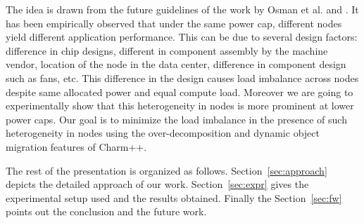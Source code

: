The idea  is drawn from the future guidelines of the work by Osman et
al.\cite{powerCluster2013} and \cite{osmanthesis}.  It has been empirically
observed that under the same power cap, different nodes yield different
application performance. This can be due to several design factors: difference
in chip designs, different in component assembly by the machine vendor,
   location of the node in the data center, difference in component design such
   as fans, etc. This difference in the design causes load imbalance across
   nodes despite same allocated power and equal compute load. Moreover we are
   going to experimentally show that this heterogeneity in nodes is more
   prominent at lower power caps.  Our goal is to minimize the load imbalance
   in the presence of such heterogeneity in nodes using the over-decomposition
   and dynamic object migration features of Charm++\cite{ChareKernelICPP90}. 

The rest of the presentation is organized as follows. Section~\ref{sec:approach}
depicts the detailed approach of our work. Section~\ref{sec:expr} gives the
experimental setup used and the results obtained. Finally the
Section~\ref{sec:fw} points out the conclusion and the future work.
